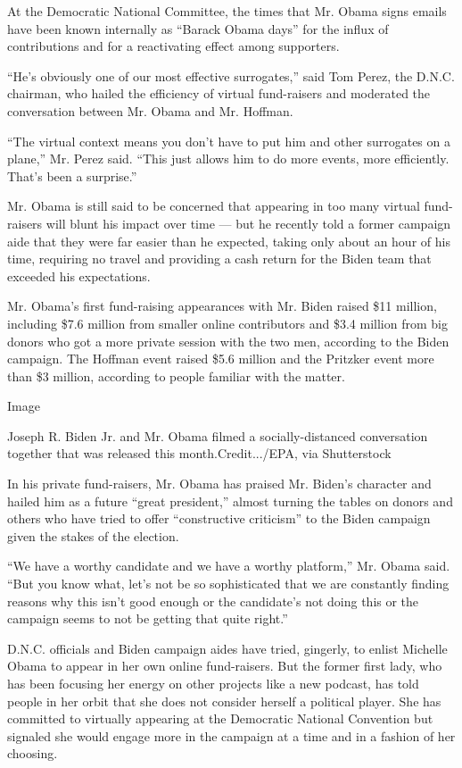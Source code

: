 At the Democratic National Committee, the times that Mr. Obama signs
emails have been known internally as ``Barack Obama days'' for the
influx of contributions and for a reactivating effect among supporters.

``He's obviously one of our most effective surrogates,'' said Tom Perez,
the D.N.C. chairman, who hailed the efficiency of virtual fund-raisers
and moderated the conversation between Mr. Obama and Mr. Hoffman.

``The virtual context means you don't have to put him and other
surrogates on a plane,'' Mr. Perez said. ``This just allows him to do
more events, more efficiently. That's been a surprise.''

Mr. Obama is still said to be concerned that appearing in too many
virtual fund-raisers will blunt his impact over time --- but he recently
told a former campaign aide that they were far easier than he expected,
taking only about an hour of his time, requiring no travel and providing
a cash return for the Biden team that exceeded his expectations.

Mr. Obama's first fund-raising appearances with Mr. Biden raised \$11
million, including \$7.6 million from smaller online contributors and
\$3.4 million from big donors who got a more private session with the
two men, according to the Biden campaign. The Hoffman event raised \$5.6
million and the Pritzker event more than \$3 million, according to
people familiar with the matter.

Image

Joseph R. Biden Jr. and Mr. Obama filmed a socially-distanced
conversation together that was released this month.Credit.../EPA, via
Shutterstock

In his private fund-raisers, Mr. Obama has praised Mr. Biden's character
and hailed him as a future ``great president,'' almost turning the
tables on donors and others who have tried to offer ``constructive
criticism'' to the Biden campaign given the stakes of the election.

``We have a worthy candidate and we have a worthy platform,'' Mr. Obama
said. ``But you know what, let's not be so sophisticated that we are
constantly finding reasons why this isn't good enough or the candidate's
not doing this or the campaign seems to not be getting that quite
right.''

D.N.C. officials and Biden campaign aides have tried, gingerly, to
enlist Michelle Obama to appear in her own online fund-raisers. But the
former first lady, who has been focusing her energy on other projects
like a new podcast, has told people in her orbit that she does not
consider herself a political player. She has committed to virtually
appearing at the Democratic National Convention but signaled she would
engage more in the campaign at a time and in a fashion of her choosing.

